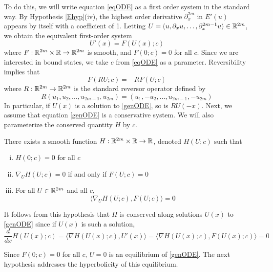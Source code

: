 \documentclass[thesis.tex]{subfiles}
\begin{document}
To do this, we will write equation \eqref{eqODE} as a first order system in the standard way. By Hypothesis \ref{Ehyp}(iv), the highest order derivative $\partial_x^{2m}$ in $E'(u)$ appears by itself with a coefficient of 1. Letting $U = (u, \partial_x u, \dots, \partial_x^{2m-1} u) \in {\mathbb R}^{2m}$, we obtain the equivalent first-order system
\begin{equation}\label{genODE}
U'(x) = F(U(x); c)
\end{equation}
where $F: {\mathbb R}^{2m} \times {\mathbb R} \rightarrow {\mathbb R}^{2m}$ is smooth, and $F(0; c) = 0$ for all $c$. Since we are interested in bound states, we take $c$ from \eqref{eqODE} as a parameter. Reversibility implies that
\begin{equation}\label{genODErev}
F(RU; c) = -RF(U; c)
\end{equation}
where $R:{\mathbb R}^{2m} \rightarrow {\mathbb R}^{2m}$ is the standard reversor operator defined by
\begin{equation}\label{reverserR2m}
R(u_1, u_2, \dots, u_{2m-1}, u_{2m}) = (u_1, -u_2, \dots, u_{2m-1}, -u_{2m})
\end{equation}
In particular, if $U(x)$ is a solution to \eqref{genODE}, so is $RU(-x)$. Next, we assume that equation \eqref{genODE} is a conservative system. We will also parameterize the conserved quantity $H$ by $c$.

\begin{hypothesis}\label{Hhyp}
There exists a smooth function $H: {\mathbb R}^{2m} \times {\mathbb R} \rightarrow {\mathbb R}$, denoted $H(U; c)$ such that 
\begin{enumerate}[(i)]
\item $H(0; c) = 0$ for all $c$
\item $\nabla_U H(U; c) = 0$ if and only if $F(U; c) = 0$
\item For all $U \in {\mathbb R}^{2m}$ and all $c$,
\begin{equation}
\langle \nabla_U H(U; c), F(U; c) \rangle = 0
\end{equation}
\end{enumerate}
\end{hypothesis}

It follows from this hypothesis that $H$ is conserved along solutions $U(x)$ to \eqref{genODE} since if $U(x)$ is such a solution,
\[
\frac{d}{dx}H(U(x); c) = \langle \nabla H(U(x); c), U'(x) \rangle
= \langle \nabla H(U(x); c), F(U(x); c) \rangle = 0
\]

Since $F(0; c) = 0$ for all $c$, $U = 0$ is an equilibrium of \eqref{genODE}. The next hypothesis addresses the hyperbolicity of this equilibrium.
\end{document}
